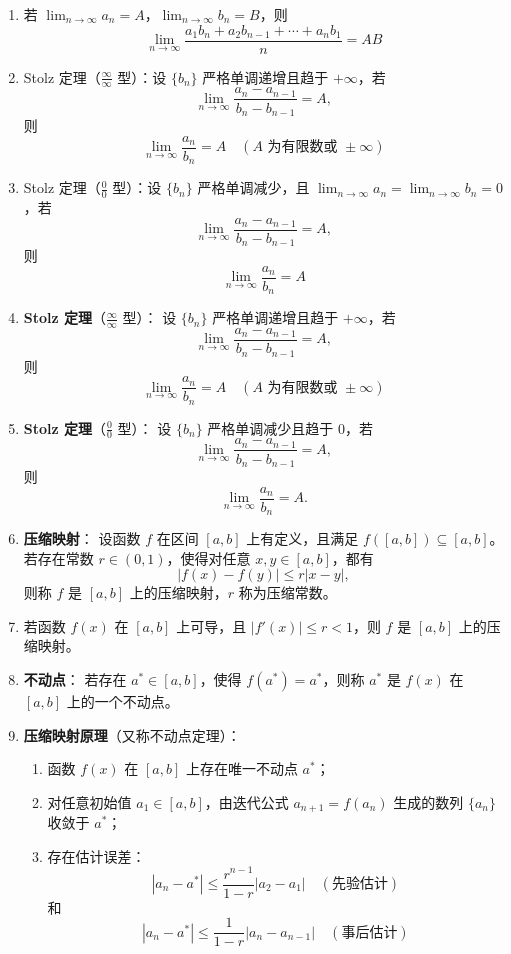\documentclass[UTF8]{ctexart}
\theoremstyle{remark}
\begin{document}
\begin{enumerate}
			\item 若 $ \lim_{n \to \infty} a_n = A $，$ \lim_{n \to \infty} b_n = B $，则
			$$
			\lim_{n \to \infty} \frac{a_1 b_n + a_2 b_{n-1} + \cdots + a_n b_1}{n} = AB
			$$
			
			\item Stolz 定理（$\frac{\infty}{\infty}$ 型）：设 $ \{b_n\} $ 严格单调递增且趋于 $ +\infty $，若
			$$
			\lim_{n \to \infty} \frac{a_n - a_{n-1}}{b_n - b_{n-1}} = A,
			$$
			则
			$$
			\lim_{n \to \infty} \frac{a_n}{b_n} = A \quad (A \text{ 为有限数或 } \pm \infty)
			$$
			
			\item Stolz 定理（$\frac{0}{0}$ 型）：设 $ \{b_n\} $ 严格单调减少，且 $ \lim_{n \to \infty} a_n = \lim_{n \to \infty} b_n = 0 $，若
			$$
			\lim_{n \to \infty} \frac{a_n - a_{n-1}}{b_n - b_{n-1}} = A,
			$$
			则
			$$
			\lim_{n \to \infty} \frac{a_n}{b_n} = A
			$$
		
				\item \textbf{Stolz 定理}（$\frac{\infty}{\infty}$ 型）：
				设 $\{b_n\}$ 严格单调递增且趋于 $ +\infty $，若
				$$
				\lim_{n \to \infty} \frac{a_n - a_{n-1}}{b_n - b_{n-1}} = A,
				$$
				则
				$$
				\lim_{n \to \infty} \frac{a_n}{b_n} = A \quad (A \text{ 为有限数或 } \pm\infty)
				$$
				
				\item \textbf{Stolz 定理}（$\frac{0}{0}$ 型）：
				设 $\{b_n\}$ 严格单调减少且趋于 $ 0 $，若
				$$
				\lim_{n \to \infty} \frac{a_n - a_{n-1}}{b_n - b_{n-1}} = A,
				$$
				则
				$$
				\lim_{n \to \infty} \frac{a_n}{b_n} = A.
				$$
				
				\item \textbf{压缩映射}：
				设函数 $ f $ 在区间 $[a, b]$ 上有定义，且满足 $ f([a, b]) \subseteq [a, b] $。若存在常数 $ r \in (0, 1) $，使得对任意 $ x, y \in [a, b] $，都有
				$$
				|f(x) - f(y)| \leq r|x - y|,
				$$
				则称 $ f $ 是 $[a, b]$ 上的压缩映射，$ r $ 称为压缩常数。
				
				\item 若函数 $ f(x) $ 在 $[a, b]$ 上可导，且 $ |f'(x)| \leq r < 1 $，则 $ f $ 是 $[a, b]$ 上的压缩映射。
				
				\item \textbf{不动点}：
				若存在 $ a^* \in [a, b] $，使得 $ f(a^*) = a^* $，则称 $ a^* $ 是 $ f(x) $ 在 $[a, b]$ 上的一个不动点。
				
				\item \textbf{压缩映射原理}（又称不动点定理）：
				\begin{enumerate}
					\item 函数 $ f(x) $ 在 $[a, b]$ 上存在唯一不动点 $ a^* $；
					\item 对任意初始值 $ a_1 \in [a, b] $，由迭代公式 $ a_{n+1} = f(a_n) $ 生成的数列 $ \{a_n\} $ 收敛于 $ a^* $；
					\item 存在估计误差：
					$$
					|a_n - a^*| \leq \frac{r^{n-1}}{1 - r} |a_2 - a_1| \quad (\text{先验估计})
					$$
					和
					$$
					|a_n - a^*| \leq \frac{1}{1 - r} |a_n - a_{n-1}| \quad (\text{事后估计})
					$$
				\end{enumerate}
				

\end{enumerate}
\end{document}
